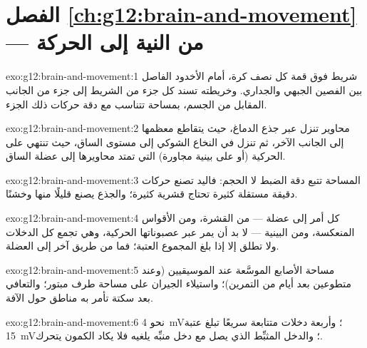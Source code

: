 \section*{الفصل \ref{ch:g12:brain-and-movement} --- من النية إلى الحركة}

\begin{solution}{exo:g12:brain-and-movement:1}
شريط فوق قمة كل نصف كرة، أمام الأخدود الفاصل بين الفصين الجبهي
والجداري. وخريطته تسند كل جزء من الشريط إلى جزء من الجانب المقابل من
الجسم، بمساحة تتناسب مع دقة حركات ذلك الجزء.
\end{solution}

\begin{solution}{exo:g12:brain-and-movement:2}
محاوير   تنزل عبر جذع الدماغ، حيث يتقاطع معظمها
إلى الجانب الآخر، ثم تنزل في النخاع الشوكي إلى مستوى الساق، حيث تنتهي
على  الحركية (أو على  بينية مجاورة) التي تمتد محاويرها
إلى عضلة الساق.
\end{solution}

\begin{solution}{exo:g12:brain-and-movement:3}
المساحة تتبع دقة الضبط لا الحجم: فاليد تصنع حركات دقيقة مستقلة كثيرة
تحتاج  قشرية كثيرة؛ والجذع يصنع قليلًا منها وخشنًا.
\end{solution}

\begin{solution}{exo:g12:brain-and-movement:4}
كل أمر إلى عضلة --- من القشرة، ومن الأقواس المنعكسة، ومن 
البينية --- لا بد أن يمر عبر عصبوناتها الحركية، وهي تجمع كل الدخلات
ولا تطلق إلا إذا بلغ المجموع العتبة؛ فما من طريق آخر إلى العضلة.
\end{solution}

\begin{solution}{exo:g12:brain-and-movement:5}
مساحة الأصابع الموسَّعة عند الموسيقيين (وعند متطوعين بعد أيام من
التمرين)؛ واستيلاء الجيران على مساحة طرف مبتور؛ والتعافي بعد سكتة
تأمر به مناطق حول الآفة.
\end{solution}

\begin{solution}{exo:g12:brain-and-movement:6}
نحو \qty{4}{mV}؛ وأربعة دخلات متتابعة سريعًا تبلغ عتبة \qty{15}{mV}؛
والدخل المثبِّط الذي يصل مع دخل منبِّه يلغيه فلا يكاد الكمون يتحرك.
\end{solution}

